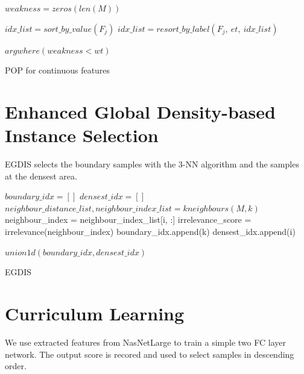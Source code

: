 \begin{algorithm}[H]
 

$weakness = zeros(len(M))$ \;

 {
	 $idx\_list = sort\_by\_value(F_j)$ \;
	 $idx\_list = resort\_by\_label(F_j,\ et,\ idx\_list)$ \;
	 
	  {
	 }
}

\Return $argwhere(weakness < wt)$ \;

\caption{POP for continuous features}
\end{algorithm}

\section{Enhanced Global Density-based Instance Selection}
EGDIS selects the boundary samples with the 3-NN algorithm and the samples at the densest area.


\begin{algorithm}[H]

$boundary\_idx = []$ \;
$densest\_idx = []$ \;
$neighbour\_distance\_list, neighbour\_index\_list = kneighbours(M, k)$ \;
 {
 	neighbour\_index = neighbour\_index\_list[i, :] \;
	irrelevance\_score = irrelevance(neighbour\_index) \;
	 {
		boundary\_idx.append(k) \;
	}{ 
	{densest\_idx.append(i)}}
}

\Return $union1d(boundary\_idx, densest\_idx)$ \;

\caption{EGDIS}
\end{algorithm}


\section{Curriculum Learning}
We use extracted features from NasNetLarge to train a simple two FC layer network. The output score is recored and used to select samples in descending order.  


